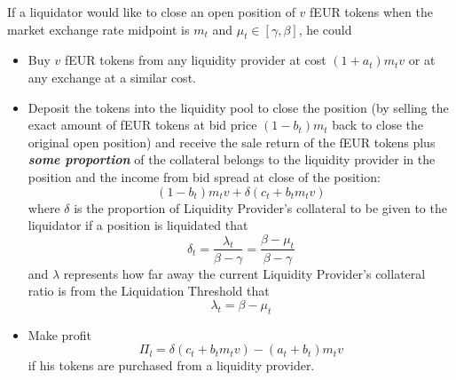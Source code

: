 \documentclass{article}
\begin{document}
If a liquidator would like to close an open position of $v$ fEUR tokens when the market exchange rate midpoint is $m_t$ and $\mu_t \in [\gamma,\beta]$, he could

\begin{itemize}

    \item Buy $v$ fEUR tokens from any liquidity provider at cost $(1+a_t)m_t v$ or at any exchange at a similar cost. 
    
    \item Deposit the tokens into the liquidity pool to close the position (by selling the exact amount of fEUR tokens at bid price $(1-b_t)m_t$ back to close the original open position) and receive the sale return of the fEUR tokens plus \textbf{\textit{some proportion}} of the collateral belongs to the liquidity provider in the position and the income from bid spread at close of the position:
    $$(1-b_t)m_t v + \delta(c_t + b_t m_t v)$$
    where $\delta$ is the proportion of Liquidity Provider's collateral to be given to the liquidator if a position is liquidated that $$ \delta_t=\frac{\lambda_t}{\beta-\gamma}=\frac{\beta-\mu_t}{\beta-\gamma}$$
    and $\lambda$ represents how far away the current Liquidity Provider's collateral ratio is from the Liquidation Threshold that $$\lambda_t=\beta-\mu_t$$
    
    \begin{center}
    \end{center}

    \item Make profit 
    $$\Pi_l = \delta(c_t + b_t m_t v) -(a_t+b_t) m_t v$$
    if his tokens are purchased from a liquidity provider.\par


\end{itemize}
\end{document}

